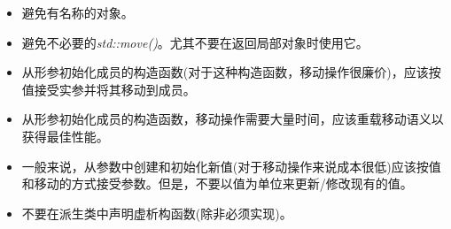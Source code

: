 \begin{itemize}
	\item 避免有名称的对象。
	\item 避免不必要的\textit{std::move()}。尤其不要在返回局部对象时使用它。
	\item 从形参初始化成员的构造函数(对于这种构造函数，移动操作很廉价)，应该按值接受实参并将其移动到成员。
	\item 从形参初始化成员的构造函数，移动操作需要大量时间，应该重载移动语义以获得最佳性能。
	\item 一般来说，从参数中创建和初始化新值(对于移动操作来说成本很低)应该按值和移动的方式接受参数。但是，不要以值为单位来更新/修改现有的值。
	\item 不要在派生类中声明虚析构函数(除非必须实现)。
\end{itemize}


\newpage